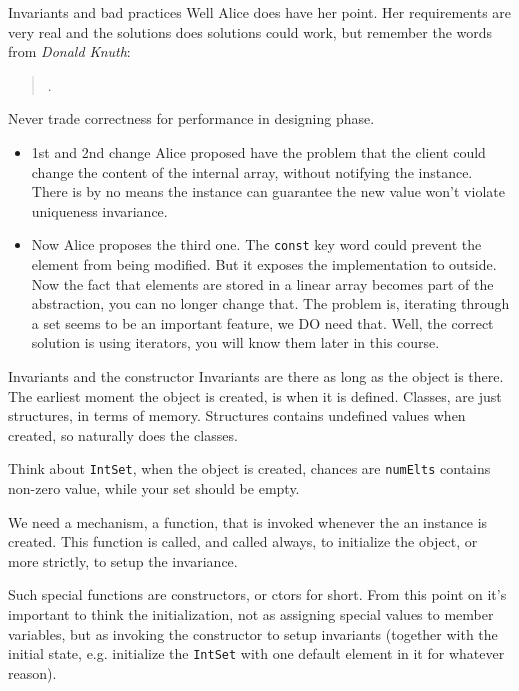 \begin{frame}{Invariants and bad practices}
Well Alice does have her point. Her requirements are very real and the solutions does solutions could work, but remember the words from \textit{Donald Knuth}:
\begin{quotation}
	.
\end{quotation}
Never trade correctness for performance in designing phase. 
\begin{itemize}
	\small
	\item 1st and 2nd change Alice proposed have the problem that the client could change the content of the internal array, without notifying the instance. There is by no means the instance can guarantee the new value won't violate uniqueness invariance.
	\item Now Alice proposes the third one. The \texttt{const} key word could prevent the element from being modified. But it exposes the implementation to outside. Now the fact that elements are stored in a linear array becomes part of the abstraction, you can no longer change that. The problem is, iterating through a set seems to be an important feature, we DO need that. Well, the correct solution is using iterators, you will know them later in this course.
\end{itemize} 
\end{frame}

\begin{frame}{Invariants and the constructor}
\alert{Invariants are there as long as the object is there.} The earliest moment the object is created, is when it is defined. Classes, are just structures, in terms of memory. Structures contains undefined values when created, so naturally does the classes. 

\vspace{0.03in}
Think about \texttt{IntSet}, when the object is created, chances are \texttt{numElts} contains non-zero value, while your set should be empty.

\vspace{0.03in}
We need a mechanism, a function, that is invoked whenever the an instance is created. This function is called, and called always, to initialize the object, or more strictly, to setup the invariance.

\vspace{0.03in}
Such special functions are \alert{constructors}, or \alert{ctors} for short. From this point on it's important to think the initialization, not as assigning special values to member variables, but as invoking the constructor to setup invariants (together with the initial state, e.g. initialize the \texttt{IntSet} with one default element in it for whatever reason).
\end{frame}

